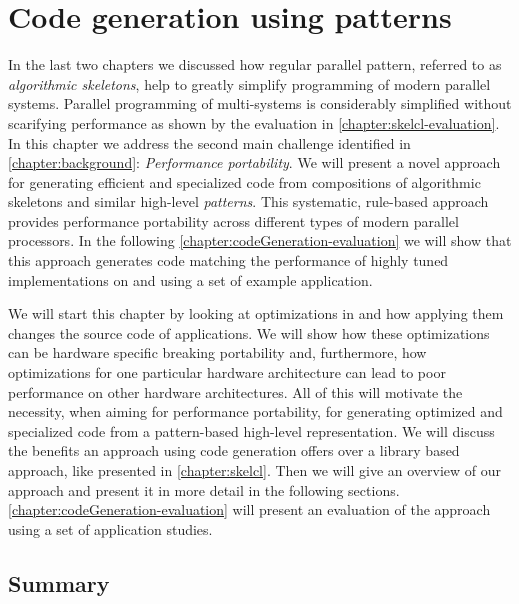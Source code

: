 
\chapter{Code generation using patterns}

\label{ch:fifth} %
\label{chapter:codeGeneration}

In the last two chapters we discussed how regular parallel pattern, referred to as \emph{algorithmic skeletons}, help to greatly simplify programming of modern parallel systems.
Parallel programming of multi-\GPU systems is considerably simplified without scarifying performance as shown by the evaluation in \autoref{chapter:skelcl-evaluation}.
In this chapter we address the second main challenge identified in \autoref{chapter:background}: \emph{Performance portability}.
We will present a novel approach for generating efficient and specialized code from compositions of algorithmic skeletons and similar high-level \emph{patterns}.
This systematic, rule-based approach provides performance portability across different types of modern parallel processors. 
In the following \autoref{chapter:codeGeneration-evaluation} we will show that this approach generates code matching the performance of highly tuned implementations on \CPUs and \GPUs using a set of example application.

We will start this chapter by looking at optimizations in \OpenCL and how applying them changes the source code of applications.
We will show how these optimizations can be hardware specific breaking portability and, furthermore, how optimizations for one particular hardware architecture can lead to poor performance on other hardware architectures.
All of this will motivate the necessity, when aiming for performance portability, for generating optimized and specialized code from a pattern-based high-level representation.
We will discuss the benefits an approach using code generation offers over a library based approach, like \SkelCL presented in \autoref{chapter:skelcl}.
Then we will give an overview of our approach and present it in more detail in the following sections.
\autoref{chapter:codeGeneration-evaluation} will present an evaluation of the approach using a set of application studies.











\section{Summary}

